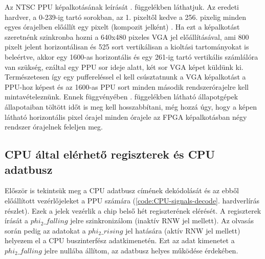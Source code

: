 Az NTSC PPU képalkotásának leírását %
. függelékben láthatjuk. Az eredeti hardver, a 0-239-ig tartó sorokban, az 1. pixeltől kedve a 256. pixelig minden egyes órajelben előállít egy pixelt (kompozit jelként)%
. Ha ezt a képalkotást szeretnénk szinkronba hozni a 640x480 pixeles VGA jel előállításával, ami 800 pixelt jelent horizontálisan és 525 sort vertikálisan a kioltási tartományokat is beleértve, akkor egy 1600-as horizontális és egy 261-ig tartó vertikális számlálóra van szükség, ezáltal egy PPU sor ideje alatt, két sor VGA képet küldünk ki. Természetesen így egy puffereléssel el kell csúsztatnunk a VGA képalkotást a PPU-hoz képest és az 1600-as PPU sort minden második rendszerórajelre kell mintavételeznünk. Ennek függvényében . függelékben látható állapotgépek állapotaiban töltött időt is meg kell hosszabbítani, még hozzá úgy, hogy a képen látható horizontális pixel órajel minden órajele az FPGA képalkotásban négy rendszer órajelnek feleljen meg. 

	\subsection{CPU által elérhető regiszterek és CPU adatbusz}
	\label{sec:CPU-databus-ppu_reg}

	Először is tekintsük meg a CPU adatbusz címének dekódolását és az ebből előállított vezérlőjeleket a PPU számára (\ref{code:CPU-signals-decode}. hardverlírás részlet). Ezek a jelek vezérlik a chip belső hét regiszterének elérését. A regiszterek írását a $phi_2\_falling$ jelre szinkronizálom (inaktív RNW jel mellett). Az olvasás során pedig az adatokat a $phi_2\_rising$ jel hatására (aktív RNW jel mellett) helyezem el a CPU buszinterfész adatkimenetén. Ezt az adat kimenetet a $phi_2\_falling$ jelre nullába állítom, az adatbusz helyes működése érdekében.
	
